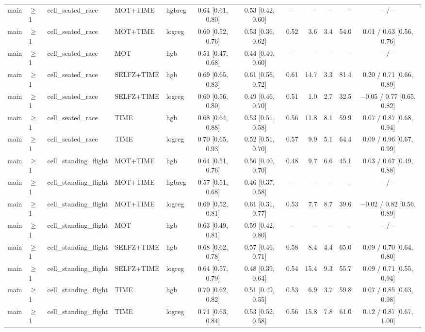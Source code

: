 \begin{longtable}{@{}lllllcccrrrc@{}}
main & $\geq$1 & cell\_seated\_race & MOT+TIME & hgbreg & 0.64 [0.61, 0.80] & 0.53 [0.42, 0.60] & -- & -- & -- & -- & -- / -- \\
main & $\geq$1 & cell\_seated\_race & MOT+TIME & logreg & 0.60 [0.52, 0.76] & 0.53 [0.36, 0.62] & 0.52 & 3.6 & 3.4 & 54.0 & 0.01 / 0.63 [0.56, 0.76] \\
main & $\geq$1 & cell\_seated\_race & MOT & hgb & 0.51 [0.47, 0.68] & 0.44 [0.40, 0.60] & -- & -- & -- & -- & -- / -- \\
main & $\geq$1 & cell\_seated\_race & SELFZ+TIME & hgb & 0.69 [0.65, 0.83] & 0.61 [0.56, 0.72] & 0.61 & 14.7 & 3.3 & 81.4 & 0.20 / 0.71 [0.66, 0.89] \\
main & $\geq$1 & cell\_seated\_race & SELFZ+TIME & logreg & 0.60 [0.56, 0.80] & 0.49 [0.46, 0.70] & 0.51 & 1.0 & 2.7 & 32.5 & $-$0.05 / 0.77 [0.65, 0.82] \\
main & $\geq$1 & cell\_seated\_race & TIME & hgb & 0.68 [0.64, 0.88] & 0.53 [0.51, 0.58] & 0.56 & 11.8 & 8.1 & 59.9 & 0.07 / 0.87 [0.68, 0.94] \\
main & $\geq$1 & cell\_seated\_race & TIME & logreg & 0.70 [0.65, 0.93] & 0.52 [0.51, 0.70] & 0.57 & 9.9 & 5.1 & 64.4 & 0.09 / 0.96 [0.67, 0.99] \\
main & $\geq$1 & cell\_standing\_flight & MOT+TIME & hgb & 0.64 [0.51, 0.76] & 0.56 [0.40, 0.70] & 0.48 & 9.7 & 6.6 & 45.1 & 0.03 / 0.67 [0.49, 0.88] \\
main & $\geq$1 & cell\_standing\_flight & MOT+TIME & hgbreg & 0.57 [0.51, 0.68] & 0.46 [0.37, 0.58] & -- & -- & -- & -- & -- / -- \\
main & $\geq$1 & cell\_standing\_flight & MOT+TIME & logreg & 0.69 [0.52, 0.81] & 0.61 [0.31, 0.77] & 0.53 & 7.7 & 8.7 & 39.6 & $-$0.02 / 0.82 [0.56, 0.89] \\
main & $\geq$1 & cell\_standing\_flight & MOT & hgb & 0.63 [0.49, 0.81] & 0.59 [0.42, 0.80] & -- & -- & -- & -- & -- / -- \\
main & $\geq$1 & cell\_standing\_flight & SELFZ+TIME & hgb & 0.68 [0.62, 0.78] & 0.57 [0.46, 0.71] & 0.58 & 8.4 & 4.4 & 65.0 & 0.09 / 0.70 [0.64, 0.80] \\
main & $\geq$1 & cell\_standing\_flight & SELFZ+TIME & logreg & 0.64 [0.57, 0.79] & 0.48 [0.39, 0.64] & 0.54 & 15.4 & 9.3 & 55.7 & 0.09 / 0.71 [0.55, 0.94] \\
main & $\geq$1 & cell\_standing\_flight & TIME & hgb & 0.70 [0.62, 0.82] & 0.51 [0.49, 0.55] & 0.53 & 6.9 & 3.7 & 59.8 & 0.07 / 0.85 [0.63, 0.98] \\
main & $\geq$1 & cell\_standing\_flight & TIME & logreg & 0.71 [0.63, 0.84] & 0.53 [0.52, 0.58] & 0.56 & 15.8 & 7.8 & 61.0 & 0.12 / 0.87 [0.67, 1.00] \\

\end{longtable}
